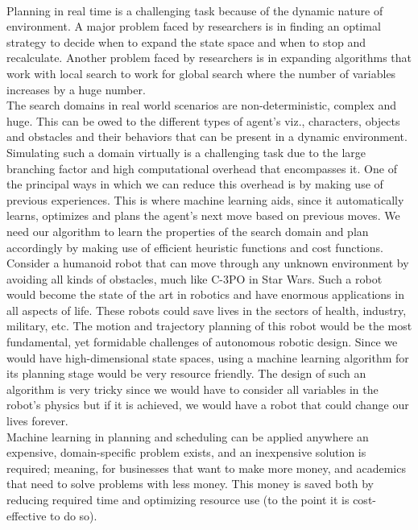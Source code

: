 \documentclass[tog]{acmsiggraph}
\begin{document}
\paragraph{}
Planning in real time is a challenging task because of the dynamic nature of environment. A major problem faced by researchers is in finding an optimal strategy to decide when to expand the state space and when to stop and recalculate. Another problem faced by researchers is in expanding algorithms that work with local search to work for global search where the number of variables increases by a huge number. 
\\
\indent The search domains in real world scenarios are non-deterministic, complex and huge. This can be owed to the different types of agent’s viz., characters, objects and obstacles and their behaviors that can be present in a dynamic environment. Simulating such a domain virtually is a challenging task due to the large branching factor and high computational overhead that encompasses it. One of the principal ways in which we can reduce this overhead is by making use of previous experiences. This is where machine learning aids, since it automatically learns, optimizes and plans the agent’s next move based on previous moves. We need our algorithm to learn the properties of the search domain and plan accordingly by making use of efficient heuristic functions and cost functions.
\\
\indent Consider a humanoid robot that can move through any unknown environment by avoiding all kinds of obstacles, much like C-3PO in Star Wars. Such a robot would become the state of the art in robotics and have enormous applications in all aspects of life. These robots could save lives in the sectors of health, industry, military, etc. The motion and trajectory planning of this robot would be the most fundamental, yet formidable challenges of autonomous robotic design. Since we would have high-dimensional state spaces, using a machine learning algorithm for its planning stage would be very resource friendly. The design of such an algorithm is very tricky since we would have to consider all variables in the robot’s physics but if it is achieved, we would have a robot that could change our lives forever.
\\
\indent Machine learning in planning and scheduling can be applied anywhere an expensive, domain-specific problem exists, and an inexpensive solution is required; meaning, for businesses that want to make more money, and academics that need to solve problems with less money. This money is saved both by reducing required time and optimizing resource use (to the point it is cost-effective to do so).
\end{document}

